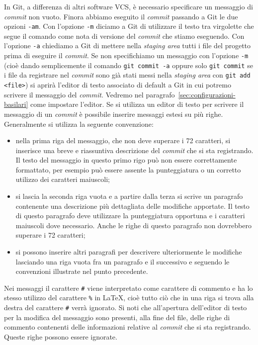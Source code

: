 \documentclass[a4paper,12pt,oneside]{article}
\begin{document}
In Git, a differenza di altri software VCS, è necessario specificare un
messaggio di \emph{commit} non vuoto. Finora abbiamo eseguito il \emph{commit}
passando a Git le due opzioni \lstinline|-am|. Con l'opzione \lstinline|-m|
diciamo a Git di utilizzare il testo tra virgolette che segue il comando come
nota di versione del \emph{commit} che stiamo eseguendo. Con l'opzione
\lstinline|-a| chiediamo a Git di mettere nella \emph{staging area} tutti i file
del progetto prima di eseguire il \emph{commit}. Se non specifichiamo un
messaggio con l'opzione \lstinline|-m| (cioè dando semplicemente il comando
\lstinline|git commit -a| oppure solo \lstinline|git commit| se i file da
registrare nel \emph{commit} sono già stati messi nella \emph{staging area} con
\lstinline|git add <file>|) si aprirà l'editor di testo associato di default a
Git in cui potremo scrivere il messaggio del \emph{commit}. Vedremo nel
paragrafo~\ref{sec:configurazioni-basilari} come impostare l'editor. Se si
utilizza un editor di testo per scrivere il messaggio di un \emph{commit} è
possibile inserire messaggi estesi su più righe. Generalmente si utilizza la
seguente convenzione:
\begin{itemize}
\item nella prima riga del messaggio, che non deve superare i 72 caratteri, si
  inserisce una breve e riassuntiva descrizione del \emph{commit} che si sta
  registrando. Il testo del messaggio in questo primo rigo può non essere
  correttamente formattato, per esempio può essere assente la punteggiatura o un
  corretto utilizzo dei caratteri maiuscoli;
\item si lascia la seconda riga vuota e a partire dalla terza si scrive un
  paragrafo contenente una descrizione più dettagliata delle modifiche
  apportate. Il testo di questo paragrafo deve utilizzare la punteggiatura
  opportuna e i caratteri maiuscoli dove necessario. Anche le righe di questo
  paragrafo non dovrebbero superare i 72 caratteri;
\item si possono inserire altri paragrafi per descrivere ulteriormente le
  modifiche lasciando una riga vuota fra un paragrafo e il successivo e seguendo
  le convenzioni illustrate nel punto precedente.
\end{itemize}

Nei messaggi il carattere \lstinline|#| viene interpretato come carattere di
commento e ha lo stesso utilizzo del carattere \lstinline|%| in \LaTeX, cioè
tutto ciò che in una riga si trova alla destra del carattere \lstinline|#| verrà
ignorato. Si noti che all'apertura dell'editor di testo per la modifica del
messaggio sono presenti, alla fine del file, delle righe di commento contenenti
delle informazioni relative al \emph{commit} che si sta registrando. Queste
righe possono essere ignorate.
\end{document}
